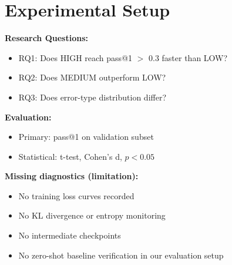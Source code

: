 \section{Experimental Setup}

\textbf{Research Questions:}
\begin{itemize}
    \item RQ1: Does HIGH reach pass@1 $>$ 0.3 faster than LOW?
    \item RQ2: Does MEDIUM outperform LOW?
    \item RQ3: Does error-type distribution differ?
\end{itemize}

\textbf{Evaluation:}
\begin{itemize}
    \item Primary: pass@1 on validation subset
    \item Statistical: t-test, Cohen's d, $p < 0.05$
\end{itemize}

\textbf{Missing diagnostics (limitation):}
\begin{itemize}
    \item No training loss curves recorded
    \item No KL divergence or entropy monitoring
    \item No intermediate checkpoints
    \item No zero-shot baseline verification in our evaluation setup
\end{itemize}
